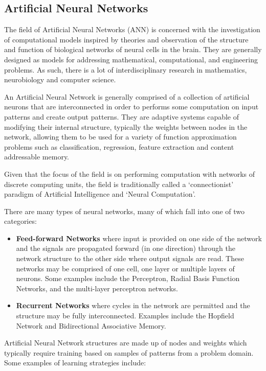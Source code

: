 \begin{bibunit}
\subsection{Artificial Neural Networks}
The field of Artificial Neural Networks (ANN) is concerned with the investigation of computational models inspired by theories and observation of the structure and function of biological networks of neural cells in the brain. They are generally designed as models for addressing mathematical, computational, and engineering problems. As such, there is a lot of interdisciplinary research in mathematics, neurobiology and computer science. 

An Artificial Neural Network is generally comprised of a collection of artificial neurons that are interconnected in order to performs some computation on input patterns and create output patterns. They are adaptive systems capable of modifying their internal structure, typically the weights between nodes in the network, allowing them to be used for a variety of function approximation problems such as classification, regression, feature extraction and content addressable memory.

Given that the focus of the field is on performing computation with networks of discrete computing units, the field is traditionally called a `connectionist' paradigm of Artificial Intelligence and `Neural Computation'.

There are many types of neural networks, many of which fall into one of two categories:

\begin{itemize}
	\item \textbf{Feed-forward Networks} where input is provided on one side of the network and the signals are propagated forward (in one direction) through the network structure to the other side where output signals are read. These networks may be comprised of one cell, one layer or multiple layers of neurons. Some examples include the Perceptron, Radial Basis Function Networks, and the multi-layer perceptron networks.
	\item \textbf{Recurrent Networks} where cycles in the network are permitted and the structure may be fully interconnected. Examples include the Hopfield Network and Bidirectional Associative Memory.
\end{itemize}

Artificial Neural Network structures are made up of nodes and weights which typically require training based on samples of patterns from a problem domain. Some examples of learning strategies include:


\end{bibunit}
